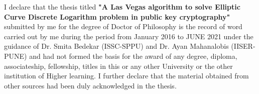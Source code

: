I declare that the thesis titled \textbf{"A Las Vegas algorithm to solve Elliptic Curve Discrete Logarithm problem in public key cryptography"} submitted by me for the degree of Doctor of Philosophy is the record of word carried out by me during the period from January 2016 to JUNE 2021 under the guidance of Dr. Smita Bedekar (ISSC-SPPU) and Dr. Ayan Mahanalobis (IISER-PUNE) and had not formed the basis for the award of any degree, diploma, associateship, fellowship, titles in this or any other University or the other institution of Higher learning. I further declare that the material obtained from other sources had been duly acknowledged in the thesis.
